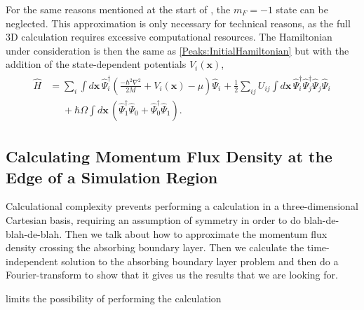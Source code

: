 For the same reasons mentioned at the start of , the $m_F=-1$ state can be neglected. This approximation is only necessary for technical reasons, as the full 3D calculation requires excessive computational resources. The Hamiltonian under consideration is then the same as \eqref{Peaks:InitialHamiltonian} but with the addition of the state-dependent potentials $V_i(\bm{x})$,
\begin{align}
    \begin{split}
    \hat{H} &= \sum_i \int d\bm{x}\, \hat{\Psi}_i^\dagger \left(\frac{-\hbar^2 \nabla^2}{2 M} + V_i(\bm{x})- \mu\right)\hat{\Psi}_i^{\phantom{\dagger}} + \frac{1}{2} \sum_{i j} U_{i j}\int d\bm{x}\, \hat{\Psi}_i^\dagger \hat{\Psi}_j^\dagger \hat{\Psi}_j^{\phantom{\dagger}} \hat{\Psi}_i^{\phantom{\dagger}}\\
            &\phantom{=} + \hbar \Omega \int d\bm{x}\, \left(\hat{\Psi}_1^\dagger \hat{\Psi}_0^{\phantom{\dagger}} + \hat{\Psi}_0^\dagger \hat{\Psi}_1^{\phantom{\dagger}}\right).
    \end{split}
\end{align}



\subsection{Calculating Momentum Flux Density at the Edge of a Simulation Region}




Calculational complexity prevents performing a calculation in a three-dimensional Cartesian basis, requiring an assumption of symmetry in order to do blah-de-blah-de-blah. Then we talk about how to approximate the momentum flux density crossing the absorbing boundary layer. Then we calculate the time-independent solution to the absorbing boundary layer problem and then do a Fourier-transform to show that it gives us the results that we are looking for.



limits the possibility of performing the calculation 